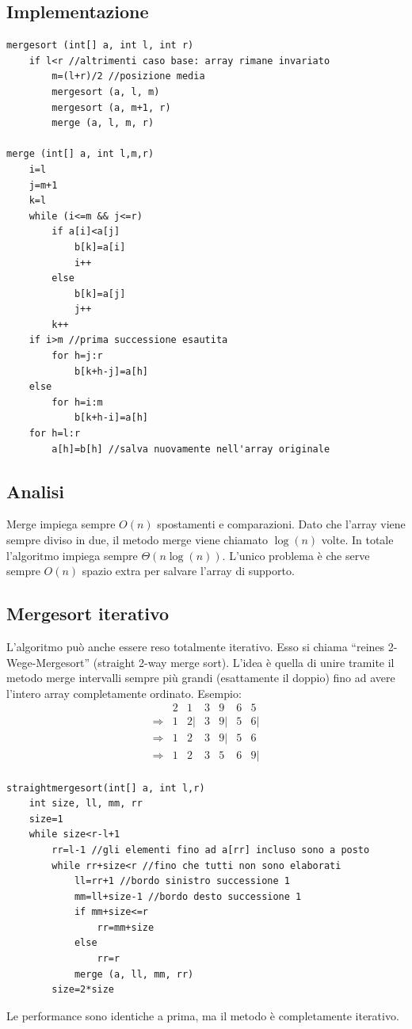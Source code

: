 \documentclass[a4paper]{book}
\newcommand{\lstIndent}{4}
\begin{document}
\subsection*{Implementazione}
\begin{lstlisting}[tabsize=\lstIndent]
mergesort (int[] a, int l, int r)
	if l<r //altrimenti caso base: array rimane invariato
		m=(l+r)/2 //posizione media
		mergesort (a, l, m)
		mergesort (a, m+1, r)
		merge (a, l, m, r)
		
merge (int[] a, int l,m,r)
	i=l
	j=m+1
	k=l
	while (i<=m && j<=r)
		if a[i]<a[j]
			b[k]=a[i]
			i++
		else
			b[k]=a[j]
			j++
		k++
	if i>m //prima successione esautita
		for h=j:r
			b[k+h-j]=a[h]
	else
		for h=i:m
			b[k+h-i]=a[h]
	for h=l:r
		a[h]=b[h] //salva nuovamente nell'array originale									
\end{lstlisting}
\subsection*{Analisi}
Merge impiega sempre $O(n)$ spostamenti e comparazioni. Dato che l'array viene sempre diviso in due, il metodo merge viene chiamato $\log(n)$ volte. In totale l'algoritmo impiega sempre $\Theta (n \log(n))$. L'unico problema è che serve sempre $O(n)$ spazio extra per salvare l'array di supporto.
\subsection*{Mergesort iterativo}
L'algoritmo può anche essere reso totalmente iterativo. Esso si chiama ``reines 2-Wege-Mergesort'' (straight 2-way merge sort). L'idea è quella di unire tramite il metodo merge intervalli sempre più grandi (esattamente il doppio) fino ad avere l'intero array completamente ordinato. Esempio:
\[\begin{array}{*{20}{c}}
{}&{2}&1&{3}&{9}&6&5\\
{\Rightarrow}&1&{2|}&{3}&{9|}&5&{6|}\\
{\Rightarrow}&1&{2}&{3}&{9|}&5&6\\
{\Rightarrow}&1&{2}&{3}&5&{6}&{9|}\\
\end{array}\]
\begin{lstlisting}[tabsize=\lstIndent]
straightmergesort(int[] a, int l,r)
	int size, ll, mm, rr
	size=1
	while size<r-l+1
		rr=l-1 //gli elementi fino ad a[rr] incluso sono a posto
		while rr+size<r //fino che tutti non sono elaborati
			ll=rr+1 //bordo sinistro successione 1
			mm=ll+size-1 //bordo desto successione 1
			if mm+size<=r
				rr=mm+size
			else
				rr=r
			merge (a, ll, mm, rr)
		size=2*size				
\end{lstlisting}
Le performance sono identiche a prima, ma il metodo è completamente iterativo.
\end{document}
